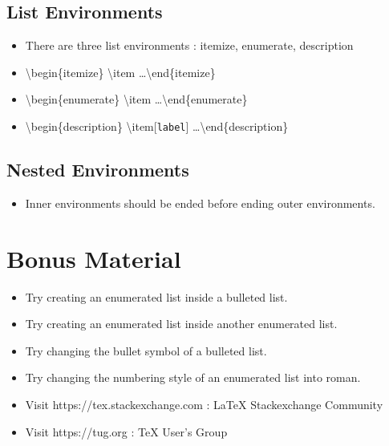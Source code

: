 \documentclass{article}
\begin{document}
\subsection{List Environments}
\begin{itemize}
	\item There are three list environments : itemize, enumerate, description
	\item \textbackslash{}begin\{itemize\} \textbackslash{}item \dots \textbackslash{}end\{itemize\}
	\item \textbackslash{}begin\{enumerate\} \textbackslash{}item \dots \textbackslash{}end\{enumerate\}
	\item \textbackslash{}begin\{description\} \textbackslash{}item[\texttt{label}] \dots \textbackslash{}end\{description\}
\end{itemize}

\subsection*{Nested Environments}
\begin{itemize}
	\item Inner environments should be ended before ending outer environments.
\end{itemize}

\section*{Bonus Material}
\begin{itemize}
	\item Try creating an enumerated list inside a bulleted list.
	\item Try creating an enumerated list inside another enumerated list.
	\item Try changing the bullet symbol of a bulleted list.
	\item Try changing the numbering style of an enumerated list into roman.
	\item Visit https://tex.stackexchange.com : \LaTeX{} Stackexchange Community
	\item Visit https://tug.org : \TeX{} User's Group
\end{itemize}


%
%
\end{document}
